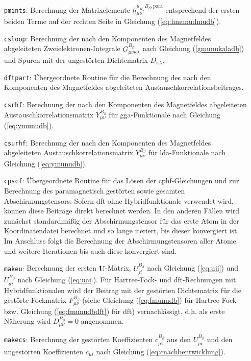 \begin{itemize}[leftmargin=60pt]
\item[\texttt{pmints}:] Berechnung der Matrixelemente $h_{\mu\nu}^{\mu_{K_\alpha}B_\beta,\textrm{para}}$ entsprechend der ersten beiden Terme auf der rechten Seite in Gleichung (\ref{eq:hmunudmudb}).
\item[\texttt{csloop}:] Berechnung der nach den Komponenten des Magnetfeldes abgeleiteten Zweielektronen-Integrale $G_{\mu\nu\kappa\lambda}^{B_\beta}$ nach Gleichung (\ref{gmunukaladb}) und Spuren mit der ungestörten Dichtematrix $D_{\kappa\lambda}$.
\item[\texttt{dftpart}:] Übergeordnete Routine für die Berechnung des nach den Komponenten des Magnetfeldes abgeleiteten Austauschkorrelationsbeitrages.
\item[\texttt{csrhf}:] Berechnung der nach den Komponenten des Magnetfeldes abgeleiteten Austauschkorrelationsmatrix $Y_{\mu\nu}^{B_\beta}$ für \ac{gga}-Funktionale nach Gleichung (\ref{eq:ymunudb}).
\item[\texttt{csurhf}:] Berechnung der nach den Komponenten des Magnetfeldes abgeleiteten Austauschkorrelationsmatrix $Y_{\mu\nu}^{B_\beta}$ für \ac{lda}-Funktionale nach Gleichung (\ref{eq:ymunudb}).
\item[\texttt{cpscf}:] Übergeordnete Routine für das Lösen der \ac{cphf}-Gleichungen und zur Berechnung des paramagnetisch gestörten sowie gesamten Abschirmungstensors. Sofern \ac{dft} ohne Hybridfunktionale verwendet wird, können diese Beiträge direkt berechnet werden. In den anderen Fällen wird zunächst standardmäßig der Abschirmungstensor für das erste Atom in der Koordinatendatei berechnet und so lange iteriert, bis dieser konvergiert ist. Im Anschluss folgt die Berechnung der Abschirmungstensoren aller Atome und weitere Iterationen bis auch diese konvergiert sind. 
\item[\texttt{makeu}:] Berechnung der ersten $\boldsymbol {U}$-Matrix, $U_{ji}^{B_\beta}$ nach Gleichung (\ref{eq:uji}) und $U_{ai}^{B_\beta}$ nach Gleichung (\ref{eq:uai}). Für Hartree-Fock- und \ac{dft}-Rechnungen mit Hybridfunktionalen wird der Beitrag mit der gestörten Dichtematrix für die gestörte Fockmatrix $F_{\mu\nu}^{B_\beta}$ (siehe Gleichung (\ref{eq:fmunudb}) für Hartree-Fock bzw. Gleichung (\ref{eq:fmunudbdft}) für \ac{dft}) vernachlässigt, d.h. als erste Näherung wird $D_{\mu\nu}^{B_\beta}=0$ angenommen.
\item[\texttt{makecs}:] Berechnung der gestörten Koeffizienten $c_{\mu i}^{B_\beta}$ aus den $U_{pi}^{B_\beta}$ und den ungestörten Koeffizienten $c_{\mu i}$ nach Gleichung (\ref{eq:cnachbentwicklung}).

\end{itemize}
